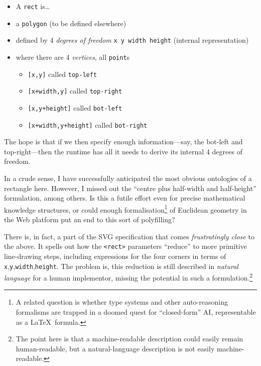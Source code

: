 \begin{itemize}
\tightlist
\item
  A \texttt{rect} is\ldots{}
\item
  a \texttt{polygon} (to be defined elsewhere)
\item
  defined by 4 \emph{degrees of freedom} \texttt{x\ y\ width\ height}
  (internal representation)
\item
  where there are 4 \emph{vertices}, all \texttt{point}s

  \begin{itemize}
  \tightlist
  \item
    \texttt{{[}x,y{]}} called \texttt{top-left}
  \item
    \texttt{{[}x+width,y{]}} called \texttt{top-right}
  \item
    \texttt{{[}x,y+height{]}} called \texttt{bot-left}
  \item
    \texttt{{[}x+width,y+height{]}} called \texttt{bot-right}
  \end{itemize}
\end{itemize}

The hope is that if we then specify enough information---say, the
bot-left and top-right---then the runtime has all it needs to derive its
internal 4 degrees of freedom.

In a crude sense, I have successfully anticipated the most obvious
ontologies of a rectangle here. However, I missed out the ``centre plus
half-width and half-height'' formulation, among others. Is this a futile
effort even for precise mathematical knowledge structures, or could
enough formalisation\footnote{A related question is whether type systems
  and other auto-reasoning formalisms are trapped in a doomed quest for
  ``closed-form'' AI, representable as a \LaTeX~formula.} of Euclidean
geometry in the Web platform put an end to this sort of polyfilling?

There is, in fact, a part of the SVG specification \cite{svg-rect} that
comes \emph{frustratingly close} to the above. It spells out how the
\texttt{\textless{}rect\textgreater{}} parameters ``reduce'' to more
primitive line-drawing steps, including expressions for the four corners
in terms of \texttt{x},\texttt{y},\texttt{width},\texttt{height}{}. The
problem is, this reduction is still described in \emph{natural language}
for a human implementor, missing the potential in such a
formulation.\footnote{The point here is that a machine-readable
  description could easily remain human-readable, but a natural-language
  description is not easily machine-readable.}

